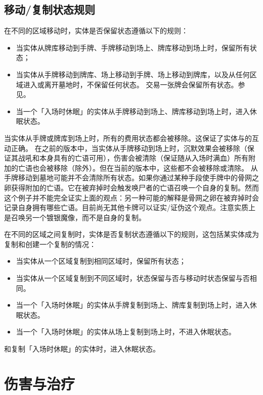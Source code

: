 \subsection{移动/复制状态规则}

在不同的区域移动时，实体是否保留状态遵循以下的规则：
\begin{itemize}
    \item 当实体从牌库移动到手牌、手牌移动到场上、牌库移动到场上时，保留所有状态；
    \item 当实体从手牌移动到牌库、场上移动到手牌、场上移动到牌库，以及从任何区域进入或离开墓地时，不保留任何状态。
        \exception 交易一张牌会保留所有状态。参见。
    \item 当一个「入场时休眠」的实体从手牌移动到场上、牌库移动到场上时，进入休眠状态。
\end{itemize}

\notice 当实体从手牌或牌库到场上时，所有的费用状态都会被移除。这保证了实体与的互动正确。
\notice {}在之前的版本中，当实体从手牌移动到场上时，沉默效果会被移除（保证其战吼和本身具有的亡语可用），伤害会被清除（保证随从入场时满血）所有附加的亡语也会被移除（除外）。但在当前的版本中，这些都不会被移除或清除。
\exception 从手牌移动到墓地可能并不会清除所有状态。如果你通过某种手段使手牌中的骨网之卵获得附加的亡语。它在被弃掉时会触发唤尸者的亡语召唤一个自身的复制。然而这个例子并不能完全证实上面的观点：另一种可能的解释是骨网之卵在被弃掉时会记录自身拥有哪些亡语。目前尚无其他卡牌可以证实/证伪这个观点。注意实质上是召唤另一个镀银魔像，而不是自身的复制。

在不同的区域之间复制时，实体是否复制状态遵循以下的规则，这包括某实体成为复制和创建一个复制的情况：
\begin{itemize}
    \item 当实体从一个区域复制到相同区域时，保留所有状态；
    \item 当实体从一个区域复制到不同区域时，状态保留与否与移动时状态保留与否相同。
    \item 当一个「入场时休眠」的实体从手牌复制到场上、牌库复制到场上时，进入休眠状态。
    \item 当一个「入场时休眠」的实体从场上复制到场上时，不进入休眠状态。
\end{itemize}
\exception {}和复制「入场时休眠」的实体时，进入休眠状态。

\section{伤害与治疗}
\label{damage-healing}

